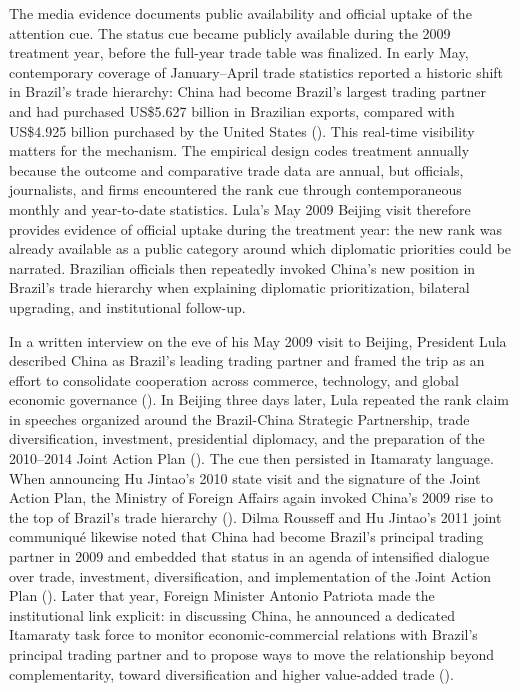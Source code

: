 \documentclass[
  12pt,
]{article}
\begin{document}
\clearpage

The media evidence documents public availability and official uptake of the attention cue. The status cue became publicly available during the 2009 treatment year, before the full-year trade table was finalized. In early May, contemporary coverage of January--April trade statistics reported a historic shift in Brazil's trade hierarchy: China had become Brazil's largest trading partner and had purchased US\$5.627 billion in Brazilian exports, compared with US\$4.925 billion purchased by the United States (). This real-time visibility matters for the mechanism. The empirical design codes treatment annually because the outcome and comparative trade data are annual, but officials, journalists, and firms encountered the rank cue through contemporaneous monthly and year-to-date statistics. Lula's May 2009 Beijing visit therefore provides evidence of official uptake during the treatment year: the new rank was already available as a public category around which diplomatic priorities could be narrated. Brazilian officials then repeatedly invoked China's new position in Brazil's trade hierarchy when explaining diplomatic prioritization, bilateral upgrading, and institutional follow-up.

In a written interview on the eve of his May 2009 visit to Beijing, President Lula described China as Brazil's leading trading partner and framed the trip as an effort to consolidate cooperation across commerce, technology, and global economic governance (). In Beijing three days later, Lula repeated the rank claim in speeches organized around the Brazil-China Strategic Partnership, trade diversification, investment, presidential diplomacy, and the preparation of the 2010--2014 Joint Action Plan (). The cue then persisted in Itamaraty language. When announcing Hu Jintao's 2010 state visit and the signature of the Joint Action Plan, the Ministry of Foreign Affairs again invoked China's 2009 rise to the top of Brazil's trade hierarchy (). Dilma Rousseff and Hu Jintao's 2011 joint communiqué likewise noted that China had become Brazil's principal trading partner in 2009 and embedded that status in an agenda of intensified dialogue over trade, investment, diversification, and implementation of the Joint Action Plan (). Later that year, Foreign Minister Antonio Patriota made the institutional link explicit: in discussing China, he announced a dedicated Itamaraty task force to monitor economic-commercial relations with Brazil's principal trading partner and to propose ways to move the relationship beyond complementarity, toward diversification and higher value-added trade ().
\end{document}

